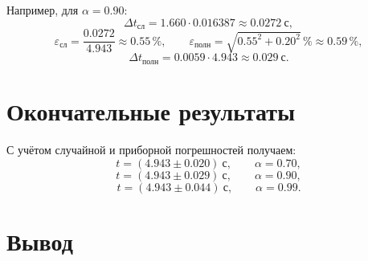 \documentclass[12pt]{article}
\begin{document}
	Например, для $\alpha = 0.90$:
	\[
		\Delta t_{\text{сл}}
		= 1.660 \cdot 0.016387
		\approx 0.0272 \ \text{с},
	\]
	\[
		\varepsilon_{\text{сл}} = \frac{0.0272}{4.943} \approx 0.55 \, \%, \qquad
		\varepsilon_{\text{полн}} = \sqrt{0.55^2 + 0.20^2} \, \% \approx 0.59 \, \%,
	\]
	\[
		\Delta t_{\text{полн}} = 0.0059 \cdot 4.943 \approx 0.029 \ \text{с}.
	\]

	\section{Окончательные результаты}

	С учётом случайной и приборной погрешностей получаем:
	\[
		t = (4.943 \pm 0.020) \ \text{с}, \qquad \alpha = 0.70,
	\]
	\[
		t = (4.943 \pm 0.029) \ \text{с}, \qquad \alpha = 0.90,
	\]
	\[
		t = (4.943 \pm 0.044) \ \text{с}, \qquad \alpha = 0.99.
	\]

	\section{Вывод}
\end{document}
